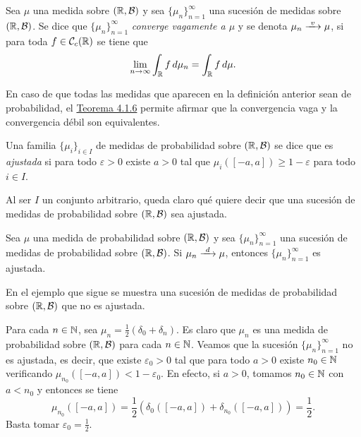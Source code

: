 \documentclass[a4paper, 11pt, extrafontsizes]{memoir}
\begin{document}
    \begin{definition}
        Sea $\mu$ una medida sobre $(\mathbb R,\mathcal{B})$ y sea $\{\mu_n\}_{n=1}^\infty$ una sucesión de medidas sobre $(\mathbb R,\mathcal{B})$. Se dice que $\{\mu_n\}_{n=1}^\infty$ \emph{converge vagamente a $\mu$} y se denota $\mu_n \vconv \mu$, si para toda $f \in \mathcal{C}_c(\mathbb R)$ se tiene que
        \[\lim_{n \to \infty} \int_\mathbb R f\,d\mu_n = \int_\mathbb R f \, d\mu.\]
    \end{definition}

    En caso de que todas las medidas que aparecen en la definición anterior sean de probabilidad, el \hyperref[teo:4.1.6]{\color{gray}Teorema 4.1.6} permite afirmar que la convergencia vaga y la convergencia débil son equivalentes.

    \begin{definition}
       Una familia $\{\mu_i\}_{i \in I}$ de medidas de probabilidad sobre $(\mathbb R,\mathcal{B})$ se dice que es \emph{ajustada} si para todo $\varepsilon > 0$ existe $a > 0$ tal que $\mu_i([-a,a]) \geq 1-\varepsilon$ para todo $i \in I$.
    \end{definition}

    Al ser $I$ un conjunto arbitrario, queda claro qué quiere decir que una sucesión de medidas de probabilidad sobre $(\mathbb R,\mathcal{B})$ sea ajustada.

    \begin{proposition}
        Sea $\mu$ una medida de probabilidad sobre $(\mathbb R,\mathcal{B})$ y sea $\{\mu_n\}_{n=1}^\infty$ una sucesión de medidas de probabilidad sobre $(\mathbb R,\mathcal{B})$. Si $\mu_n \dconv \mu$, entonces $\{\mu_n\}_{n=1}^\infty$ es ajustada.
    \end{proposition}

    En el ejemplo que sigue se muestra una sucesión de medidas de probabilidad sobre $(\mathbb R,\mathcal{B})$ que no es ajustada.

    \begin{example}
        Para cada $n \in \mathbb N$, sea $\mu_n = \frac{1}{2}(\delta_0+\delta_n)$. Es claro que $\mu_n$ es una medida de probabilidad sobre $(\mathbb R,\mathcal{B})$ para cada $n \in \mathbb N$. Veamos que la sucesión $\{\mu_n\}_{n=1}^\infty$ no es ajustada, es decir, que existe $\varepsilon_0 >0$ tal que para todo $a > 0$ existe $n_0 \in \mathbb N$ verificando $\mu_{n_0}([-a,a]) < 1-\varepsilon_0$.
        En efecto, si $a >0$, tomamos $n_0 \in \mathbb N$ con $a < n_0$ y entonces se tiene
        \[\mu_{n_0}([-a,a])  = \frac{1}{2}(\delta_0([-a,a])+\delta_{n_0}([-a,a]))= \frac{1}{2}.\]
        Basta tomar $\varepsilon_0 = \frac{1}{2}$.
    \end{example}
\end{document}
